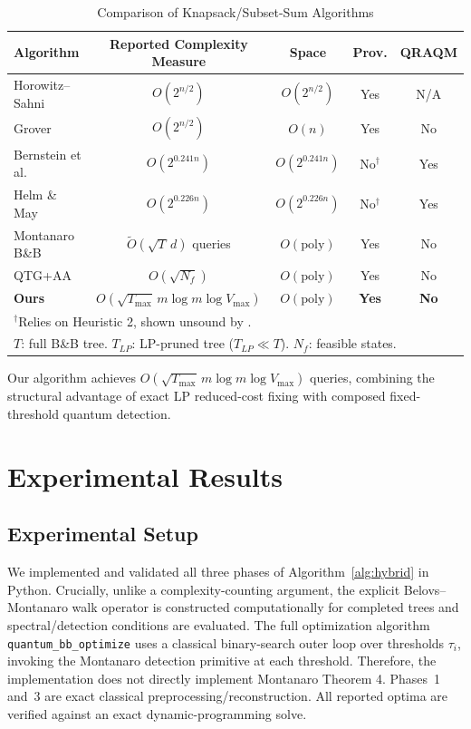 \documentclass[conference]{IEEEtran} \IEEEoverridecommandlockouts
\begin{document}
\begin{table}[htbp] \caption{Comparison of Knapsack/Subset-Sum Algorithms} \label{tab:comparison} \begin{center} \begin{tabular}{lcccc} \toprule \textbf{Algorithm} & \textbf{Reported Complexity Measure} & \textbf{Space} & \textbf{Prov.} & \textbf{QRAQM} \\ \midrule Horowitz--Sahni & $O(2^{n/2})$ & $O(2^{n/2})$ & Yes & N/A \\ Grover & $O(2^{n/2})$ & $O(n)$ & Yes & No \\ Bernstein et al. & $O(2^{0.241n})$ & $O(2^{0.241n})$ & No$^\dagger$ & Yes \\ Helm \& May & $O(2^{0.226n})$ & $O(2^{0.226n})$ & No$^\dagger$ & Yes \\ Montanaro B\&B & $\tilde{O}(\sqrt{T}\,d)$ queries & $O(\text{poly})$ & Yes & No \\ QTG+AA & $O(\sqrt{N_f})$ & $O(\text{poly})$ & Yes & No \\ \textbf{Ours} & $O(\sqrt{T_{\max}}\,m\log m\log V_{\max})$ & $O(\text{poly})$ & \textbf{Yes} & \textbf{No} \\ \bottomrule \multicolumn{5}{l}{\footnotesize $^\dagger$Relies on Heuristic 2, shown unsound by \cite{bonnetain2020improved}.} \\ \multicolumn{5}{l}{\footnotesize $T$: full B\&B tree. $T_{LP}$: LP-pruned tree ($T_{LP} \ll T$). $N_f$: feasible states.} \end{tabular} \end{center} \end{table}

Our algorithm achieves $O\!\left(\sqrt{T_{\max}}\,m\log m\log V_{\max}\right)$ queries, combining the structural advantage of exact LP reduced-cost fixing with composed fixed-threshold quantum detection.




\section{Experimental Results} \label{sec:experiments}

\subsection{Experimental Setup}
We implemented and validated all three phases of Algorithm~\ref{alg:hybrid} in Python. Crucially, unlike a complexity-counting argument, the explicit Belovs--Montanaro walk operator is constructed computationally for completed trees and spectral/detection conditions are evaluated. The full optimization algorithm \texttt{quantum\_bb\_optimize} uses a classical binary-search outer loop over thresholds $\tau_i$, invoking the Montanaro detection primitive at each threshold. Therefore, the implementation does not directly implement Montanaro Theorem 4. Phases~1 and~3 are exact classical preprocessing/reconstruction. All reported optima are verified against an exact dynamic-programming solve.
\end{document}
